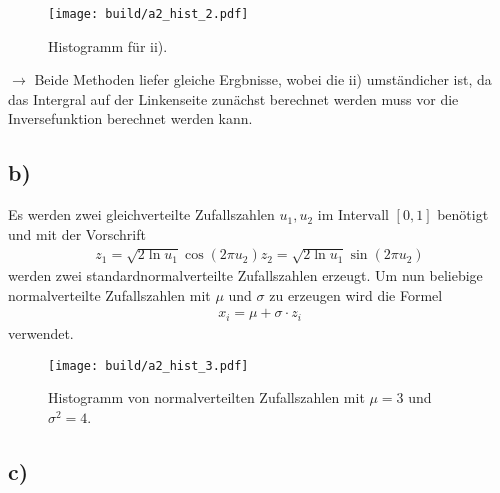 \begin{figure}
  \texttt{[image: build/a2\_hist\_2.pdf]}
  \caption{Histogramm für ii).}
\end{figure}

$\rightarrow$ Beide Methoden liefer gleiche Ergbnisse, wobei die ii) umständicher
ist, da das Intergral auf der Linkenseite zunächst berechnet werden muss vor die Inversefunktion
berechnet werden kann.


\subsection*{b)}
Es werden zwei gleichverteilte Zufallszahlen $u_1,u_2$ im Intervall $[0,1]$
benötigt und mit der Vorschrift
\begin{align}
  z_1=\sqrt{2\ln u_1}\cos(2\pi u_2)
  z_2=\sqrt{2\ln u_1}\sin(2\pi u_2)
\end{align}
werden zwei standardnormalverteilte
Zufallszahlen erzeugt.
Um nun beliebige normalverteilte
Zufallszahlen mit $\mu$ und $\sigma$ zu erzeugen
wird die Formel
\begin{align*}
x_i= \mu +\sigma\cdot z_i
\end{align*}
verwendet.

\begin{figure}
  \texttt{[image: build/a2\_hist\_3.pdf]}
  \caption{Histogramm von normalverteilten Zufallszahlen mit $\mu=3$ und $\sigma^2=4$.}
\end{figure}


\subsection*{c)}
